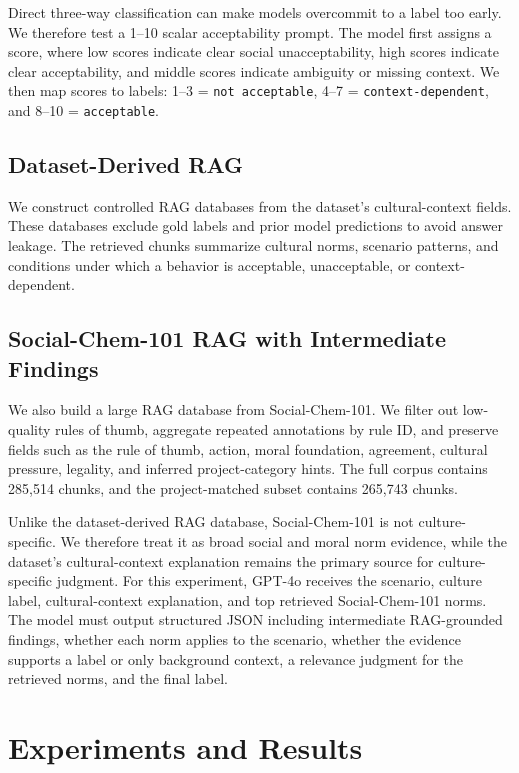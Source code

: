 \documentclass[11pt]{article}
\begin{document}
Direct three-way classification can make models overcommit to a label too early. We therefore test a 1--10 scalar acceptability prompt. The model first assigns a score, where low scores indicate clear social unacceptability, high scores indicate clear acceptability, and middle scores indicate ambiguity or missing context. We then map scores to labels: 1--3 = \texttt{not acceptable}, 4--7 = \texttt{context-dependent}, and 8--10 = \texttt{acceptable}.

\subsection{Dataset-Derived RAG}

We construct controlled RAG databases from the dataset's cultural-context fields. These databases exclude gold labels and prior model predictions to avoid answer leakage. The retrieved chunks summarize cultural norms, scenario patterns, and conditions under which a behavior is acceptable, unacceptable, or context-dependent.

\subsection{Social-Chem-101 RAG with Intermediate Findings}

We also build a large RAG database from Social-Chem-101. We filter out low-quality rules of thumb, aggregate repeated annotations by rule ID, and preserve fields such as the rule of thumb, action, moral foundation, agreement, cultural pressure, legality, and inferred project-category hints. The full corpus contains 285,514 chunks, and the project-matched subset contains 265,743 chunks.

Unlike the dataset-derived RAG database, Social-Chem-101 is not culture-specific. We therefore treat it as broad social and moral norm evidence, while the dataset's cultural-context explanation remains the primary source for culture-specific judgment. For this experiment, GPT-4o receives the scenario, culture label, cultural-context explanation, and top retrieved Social-Chem-101 norms. The model must output structured JSON including intermediate RAG-grounded findings, whether each norm applies to the scenario, whether the evidence supports a label or only background context, a relevance judgment for the retrieved norms, and the final label.

\section{Experiments and Results}
\end{document}
